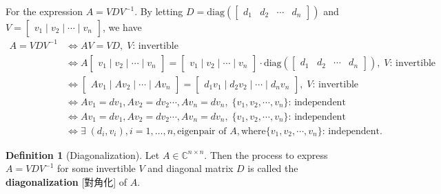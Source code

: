 \documentclass{article}
\theoremstyle{definition}
\newtheorem{definition}{Definition}[section]
\numberwithin{theorem}{section}
\numberwithin{equation}{section}
\begin{document}
For the expression $A = VDV^{-1}$. By letting $D=\text{diag}( \begin{bmatrix} d_1 &d_2 &\cdots &d_n \end{bmatrix} )$ and $V=\begin{bmatrix} v_1 \mid v_2 \mid \cdots \mid v_n \end{bmatrix}$,
we have
\begin{align*}
A = VDV^{-1}
&\Leftrightarrow AV= VD, \; V\text{: invertible} \\
&\Leftrightarrow A \begin{bmatrix} v_1 \mid v_2 \mid \cdots \mid v_n \end{bmatrix}
= \begin{bmatrix} v_1 \mid v_2 \mid \cdots \mid v_n \end{bmatrix} \cdot
\text{diag}( \begin{bmatrix} d_1 &d_2 &\cdots &d_n \end{bmatrix} ), \; V\text{: invertible} \\
&\Leftrightarrow
\begin{bmatrix} Av_1 \mid Av_2 \mid \cdots \mid Av_n \end{bmatrix}
= \begin{bmatrix} d_1v_1 \mid d_2v_2 \mid \cdots \mid d_nv_n \end{bmatrix}, \; V\text{: invertible} \\
&\Leftrightarrow Av_1=dv_1, Av_2=dv_2\cdots, Av_n=dv_n, \; \{v_1,v_2,\cdots, v_n\}\text{: independent} \\
&\Leftrightarrow Av_1=dv_1, Av_2=dv_2\cdots, Av_n=dv_n, \; \{v_1,v_2,\cdots, v_n\}\text{: independent}\\
&\Leftrightarrow \exists \; (d_i, v_i), i=1,\ldots,n, \text{eigenpair of }A, \text{where} \{v_1,v_2,\cdots, v_n\}\text{: independent}.
\end{align*}

\begin{definition}[Diagonalization]
    Let $A \in \mathbb{C}^{n \times n}$. Then the process to express $A=VDV^{-1}$ for some invertible $V$ and diagonal matrix $D$ is called the \textbf{diagonalization} [對角化] of $A$.
\end{definition}
\end{document}
